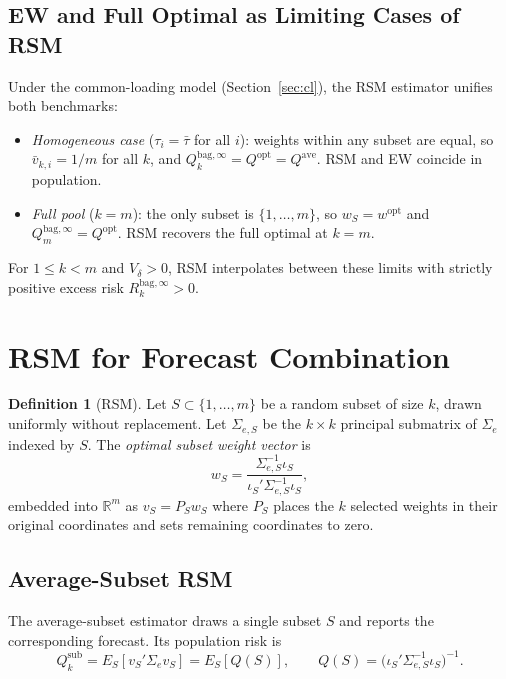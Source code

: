 \documentclass[12pt,a4paper]{article}
\theoremstyle{definition}
\newtheorem{definition}{Definition}
\begin{document}
\subsection{EW and Full Optimal as Limiting Cases of RSM}

Under the common-loading model (Section~\ref{sec:cl}), the RSM estimator
unifies both benchmarks:
\begin{itemize}[nosep]
\item \emph{Homogeneous case} ($\tau_i=\bar\tau$ for all $i$): weights within
  any subset are equal, so $\bar v_{k,i}=1/m$ for all $k$, and
  $Q_k^{\mathrm{bag},\infty}=Q^{\mathrm{opt}}=Q^{\mathrm{ave}}$. RSM
  and EW coincide in population.
\item \emph{Full pool} ($k=m$): the only subset is $\{1,\ldots,m\}$, so
  $w_S=w^{\mathrm{opt}}$ and $Q_m^{\mathrm{bag},\infty}=Q^{\mathrm{opt}}$.
  RSM recovers the full optimal at $k=m$.
\end{itemize}
For $1\leq k<m$ and $V_\delta>0$, RSM interpolates between these limits with
strictly positive excess risk $R_k^{\mathrm{bag},\infty}>0$.

\section{RSM for Forecast Combination}
\label{sec:rsm}

\begin{definition}[RSM]\label{def:rsm}
Let $S\subset\{1,\ldots,m\}$ be a random subset of size $k$, drawn
uniformly without replacement. Let $\Sigma_{e,S}$ be the $k\times k$
principal submatrix of $\Sigma_e$ indexed by $S$. The \emph{optimal
subset weight vector} is
\begin{equation}
w_S = \frac{\Sigma_{e,S}^{-1}\iota_S}{\iota_S'\Sigma_{e,S}^{-1}\iota_S},
\end{equation}
embedded into $\mathbb{R}^m$ as $v_S=P_Sw_S$ where $P_S$ places the $k$
selected weights in their original coordinates and sets remaining
coordinates to zero.
\end{definition}

\subsection{Average-Subset RSM}

The average-subset estimator draws a single subset $S$ and reports the
corresponding forecast. Its population risk is
\begin{equation}\label{eq:Qsub}
Q_k^{\mathrm{sub}} = E_S[v_S'\Sigma_e v_S] = E_S[Q(S)],
\qquad Q(S)=\bigl(\iota_S'\Sigma_{e,S}^{-1}\iota_S\bigr)^{-1}.
\end{equation}
\end{document}
